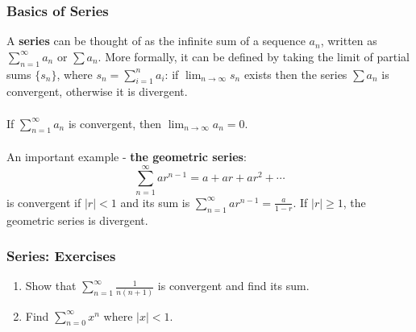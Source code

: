 \documentclass{beamer}
\begin{document}
\begin{frame}
\frametitle{Basics of Series}
A \textbf{series} can be thought of as the infinite sum of a sequence ${a_n}$, written as $\sum_{n=1}^{\infty} a_n$ or $\sum a_n$. More formally, it can be defined by taking the limit of partial sums $\{s_n\}$, where $s_n = \sum_{i=1}^{n} a_i$: if $\lim_{n \rightarrow \infty} s_n$ exists then the series $\sum a_n$ is convergent, otherwise it is divergent.
\\~\\
If $\sum_{n=1}^{\infty} a_n$ is convergent, then $\lim_{n \rightarrow \infty} a_n = 0$.
\\~\\
An important example - \textbf{the geometric series}:\\
$$
\sum_{n=1}^{\infty} ar^{n-1} = a + ar + ar^2 + \cdots
$$
is convergent if $\vert r \vert < 1$ and its sum is 
$\sum_{n=1}^{\infty} ar^{n-1} = \frac{a}{1-r}$.
If $\vert r \vert \geq 1$, the geometric series is divergent.
\end{frame}

\begin{frame}
\frametitle{Series: Exercises}
\begin{enumerate}
\item Show that $\sum_{n=1}^{\infty} \frac{1}{n(n+1)}$ is convergent and find its sum.
\vspace*{1.2in}
\item Find $\sum_{n=0}^{\infty} x^n$ where $\vert x \vert < 1$.
\vspace*{1.2in}
\end{enumerate}
\end{frame}
\end{document}
